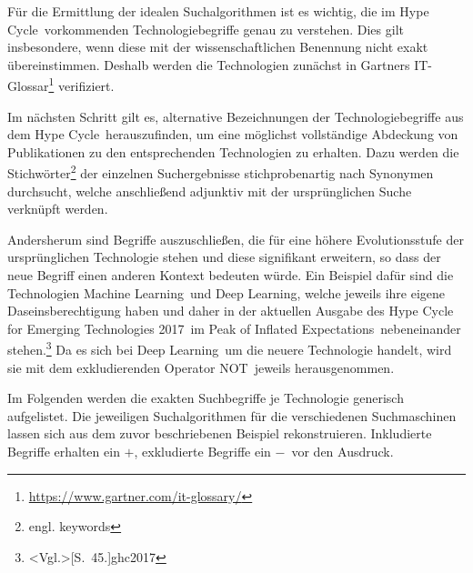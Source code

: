 Für die Ermittlung der idealen Suchalgorithmen ist es wichtig, die im \glqq Hype Cycle\grqq~vorkommenden Technologiebegriffe genau zu verstehen. Dies gilt insbesondere, wenn diese mit der wissenschaftlichen Benennung nicht exakt übereinstimmen. Deshalb werden die Technologien zunächst in Gartners IT-Glossar\footnote{\url{https://www.gartner.com/it-glossary/}} verifiziert.

Im nächsten Schritt gilt es, alternative Bezeichnungen der Technologiebegriffe aus dem \glqq Hype Cycle\grqq~herauszufinden, um eine möglichst vollständige Abdeckung von Publikationen zu den entsprechenden Technologien zu erhalten. Dazu werden die Stichwörter\footnote{engl. keywords} der einzelnen Suchergebnisse stichprobenartig nach Synonymen durchsucht, welche anschließend adjunktiv mit der ursprünglichen Suche verknüpft werden.

Andersherum sind Begriffe auszuschließen, die für eine höhere Evolutionsstufe der ursprünglichen Technologie stehen und diese signifikant erweitern, so dass der neue Begriff einen anderen Kontext bedeuten würde. Ein Beispiel dafür sind die Technologien \glqq Machine Learning\grqq~und \glqq Deep Learning\grqq, welche jeweils ihre eigene Daseinsberechtigung haben und daher in der aktuellen Ausgabe des \glqq Hype Cycle for Emerging Technologies 2017\grqq~im \glqq Peak of Inflated Expectations\grqq~nebeneinander stehen.\footnote{\citeNP<Vgl.>[S.~45.]{ghc2017}} Da es sich bei \glqq Deep Learning\grqq~um die neuere Technologie handelt, wird sie mit dem exkludierenden Operator \glqq NOT\grqq~jeweils herausgenommen.

Im Folgenden werden die exakten Suchbegriffe je Technologie generisch aufgelistet. Die jeweiligen Suchalgorithmen für die verschiedenen Suchmaschinen lassen sich aus dem zuvor beschriebenen Beispiel rekonstruieren. Inkludierte Begriffe erhalten ein \glqq $+$\grqq, exkludierte Begriffe ein \glqq $-$\grqq~vor den Ausdruck.

